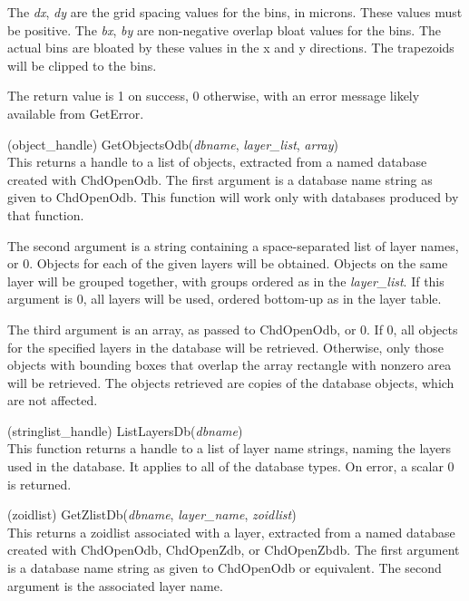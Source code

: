 \begin{description}
The {\it dx\/}, {\it dy} are the grid spacing values for the bins, in
microns.  These values must be positive.  The {\it bx\/}, {\it by} are
non-negative overlap bloat values for the bins.  The actual bins are
bloated by these values in the x and y directions.  The trapezoids
will be clipped to the bins.

The return value is 1 on success, 0 otherwise, with an error message
likely available from {\vt GetError}.

\item{(object\_handle) \vt GetObjectsOdb({\it dbname\/}, {\it layer\_list\/},
  {\it array\/})}\\
This returns a handle to a list of objects, extracted from a named
database created with {\vt ChdOpenOdb}.  The first argument is a
database name string as given to {\vt ChdOpenOdb}.  This function will
work only with databases produced by that function.

The second argument is a string containing a space-separated list of
layer names, or 0.  Objects for each of the given layers will be
obtained.  Objects on the same layer will be grouped together, with
groups ordered as in the {\it layer\_list}.  If this argument is 0,
all layers will be used, ordered bottom-up as in the layer table.

The third argument is an array, as passed to {\vt ChdOpenOdb}, or 0. 
If 0, all objects for the specified layers in the database will be
retrieved.  Otherwise, only those objects with bounding boxes that
overlap the array rectangle with nonzero area will be retrieved.  The
objects retrieved are copies of the database objects, which are not
affected.

\item{(stringlist\_handle) \vt ListLayersDb({\it dbname\/})}\\
This function returns a handle to a list of layer name strings, naming
the layers used in the database.  It applies to all of the database
types.  On error, a scalar 0 is returned.

\item{(zoidlist) \vt GetZlistDb({\it dbname\/}, {\it layer\_name\/},
  {\it zoidlist\/})}\\
This returns a zoidlist associated with a layer, extracted from a
named database created with {\vt ChdOpenOdb}, {\vt ChdOpenZdb}, or {\vt
ChdOpenZbdb}.  The first argument is a database name string as given to
{\vt ChdOpenOdb} or equivalent.  The second argument is the associated
layer name.


\end{description}
